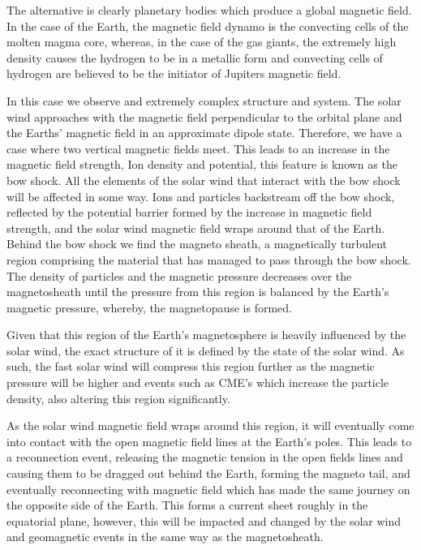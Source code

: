 The alternative is clearly planetary bodies which produce a global magnetic field.
In the case of the Earth, the magnetic field dynamo is the convecting cells of the molten magma core, whereas, in the case of the gas giants, the extremely high density causes the hydrogen to be in a metallic form and convecting cells of hydrogen are believed to be the initiator of Jupiters magnetic field.

In this case we observe and extremely complex structure and system.
The solar wind approaches with the magnetic field perpendicular to the orbital plane and the Earths' magnetic field in an approximate dipole state.
Therefore, we have a case where two vertical magnetic fields meet.
This leads to an increase in the magnetic field strength, Ion density and potential, this feature is known as the bow shock.
All the elements of the solar wind that interact with the bow shock will be affected in some way.
Ions and particles backstream off the bow shock, reflected by the potential barrier formed by the increase in magnetic field strength, and the solar wind magnetic field wraps around that of the Earth.
Behind the bow shock we find the magneto sheath, a magnetically turbulent region comprising the 
material that has managed to pass through the bow shock.
The density of particles and the magnetic pressure decreases over the magnetosheath until the pressure from this region is balanced by the Earth's magnetic pressure, whereby, the magnetopause is formed.

Given that this region of the Earth's magnetosphere is heavily influenced by the solar wind, the exact structure of it is defined by the state of the solar wind.
As such, the fast solar wind will compress this region further as the magnetic pressure will be higher and events such as CME's which increase the particle density, also altering this region significantly.

As the solar wind magnetic field wraps around this region, it will eventually come into contact with the open magnetic field lines at the Earth's poles.
This leads to a reconnection event, releasing the magnetic tension in the open fields lines and causing them to be dragged out behind the Earth, forming the magneto tail, and eventually reconnecting with magnetic field which has made the same journey on the opposite side of the Earth. 
This forms a current sheet roughly in the equatorial plane, however, this will be impacted and changed by the solar wind and geomagnetic events in the same way as the magnetosheath.

